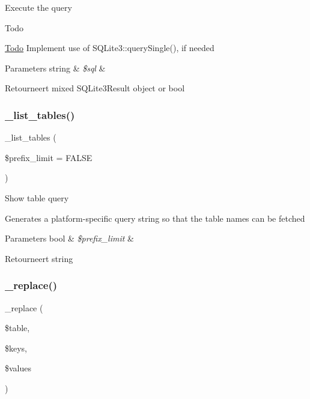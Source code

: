 Execute the query

\begin{DoxyRefDesc}{Todo}
\item[\mbox{\hyperlink{todo__todo000004}{Todo}}]Implement use of S\+Q\+Lite3\+::query\+Single(), if needed \end{DoxyRefDesc}

\begin{DoxyParams}[1]{Parameters}
string & {\em \$sql} & \\
\hline
\end{DoxyParams}
\begin{DoxyReturn}{Retourneert}
mixed S\+Q\+Lite3\+Result object or bool 
\end{DoxyReturn}
\mbox{\label{class_c_i___d_b__sqlite3__driver_a435c0f3ce54fe7daa178baa8532ebd54}} 
\subsubsection{\texorpdfstring{\_list\_tables()}{\_list\_tables()}}
{\footnotesize\ttfamily \+\_\+list\+\_\+tables (\begin{DoxyParamCaption}\item[{}]{\$prefix\+\_\+limit = {\ttfamily FALSE} }\end{DoxyParamCaption})\hspace{0.3cm}{\ttfamily [protected]}}

Show table query

Generates a platform-\/specific query string so that the table names can be fetched


\begin{DoxyParams}[1]{Parameters}
bool & {\em \$prefix\+\_\+limit} & \\
\hline
\end{DoxyParams}
\begin{DoxyReturn}{Retourneert}
string 
\end{DoxyReturn}
\mbox{\label{class_c_i___d_b__sqlite3__driver_ae0adf73984daf2d42ad29b66c484c82b}} 
\subsubsection{\texorpdfstring{\_replace()}{\_replace()}}
{\footnotesize\ttfamily \+\_\+replace (\begin{DoxyParamCaption}\item[{}]{\$table,  }\item[{}]{\$keys,  }\item[{}]{\$values }\end{DoxyParamCaption})\hspace{0.3cm}{\ttfamily [protected]}}

